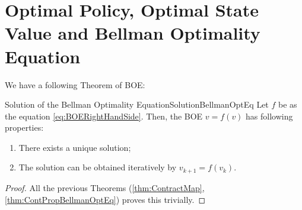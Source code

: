 \section{Optimal Policy, Optimal State Value and Bellman Optimality Equation}\label{sec:OptPolOptStateValBOE}
    We have a following Theorem of BOE:
    \begin{thm}{Solution of the Bellman Optimality Equation}{SolutionBellmanOptEq}
        Let $f$ be as the equation \ref{eq:BOERightHandSide}. Then, the BOE $v=f(v)$ has following properties:
        \begin{enumerate}
            \item There exists a unique solution;
            \item The solution can be obtained iteratively by $v_{k+1}=f(v_k)$.
        \end{enumerate}
    \end{thm}
    \begin{proof}
        All the previous Theorems (\ref{thm:ContractMap}, \ref{thm:ContPropBellmanOptEq}) proves this trivially.
    \end{proof}

